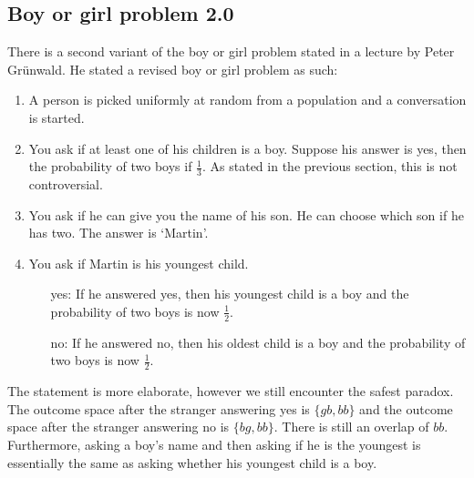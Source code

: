 \documentclass[twoside,a4paper]{article}
\theoremstyle{plain}
\theoremstyle{definition}
\theoremstyle{remark}
\numberwithin{equation}{section}
\DeclareMathOperator{\1}{\mathbbm{1}}
\begin{document}
\subsection{Boy or girl problem 2.0}
There is a second variant of the boy or girl problem stated in a lecture by Peter Grünwald. He stated a revised boy or girl problem as such:
\begin{enumerate}
	\item A person is picked uniformly at random from a population and a conversation is started.
	\item You ask if at least one of his children is a boy. Suppose his answer is yes, then the probability of two boys if $\frac{1}{3}$. As stated in the previous section, this is not controversial.
	\item You ask if he can give you the name of his son. He can choose which son if he has two. The answer is `Martin'.
	\item You ask if Martin is his youngest child.
	\begin{itemize}
		\item[yes:] If he answered yes, then his youngest child is a boy and the probability of two boys is now $\frac{1}{2}$.
		\item[no:] If he answered no, then his oldest child is a boy and the probability of two boys is now $\frac{1}{2}$.
	\end{itemize}
\end{enumerate}

The statement is more elaborate, however we still encounter the safest paradox. The outcome space after the stranger answering yes is $\{gb,bb\}$ and the outcome space after the stranger answering no is $\{bg, bb\}$. There is still an overlap of $bb$. Furthermore, asking a boy's name and then asking if he is the youngest is essentially the same as asking whether his youngest child is a boy.
\end{document}
